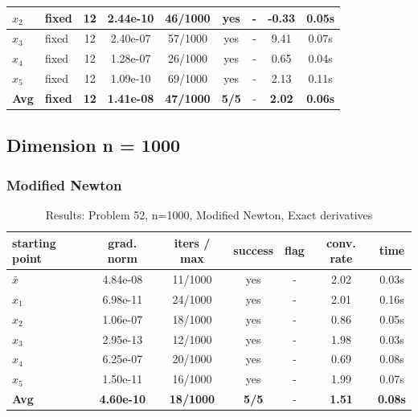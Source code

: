 \begin{longtable}{|l|l|c|c|c|c|c|c|c|}
\hline
$x_2$ & fixed & 12 & 2.44e-10 & 46/1000 & yes & - & -0.33 & 0.05s \\
\hline
$x_3$ & fixed & 12 & 2.40e-07 & 57/1000 & yes & - & 9.41 & 0.07s \\
\hline
$x_4$ & fixed & 12 & 1.28e-07 & 26/1000 & yes & - & 0.65 & 0.04s \\
\hline
$x_5$ & fixed & 12 & 1.09e-10 & 69/1000 & yes & - & 2.13 & 0.11s \\
\hline
\hline\hline
\textbf{Avg} & \textbf{fixed} & \textbf{12} & \textbf{1.41e-08} & \textbf{47/1000} & \textbf{5/5} & - & \textbf{2.02} & \textbf{0.06s} \\
\hline\hline
\end{longtable}


\subsection{Dimension n = 1000}

\subsubsection{Modified Newton}

\begin{longtable}{|l|c|c|c|c|c|c|}
\caption{Results: Problem 52, n=1000, Modified Newton, Exact derivatives} \\
\hline
\textbf{starting point} & \textbf{grad. norm} & \textbf{iters / max} & \textbf{success} & \textbf{flag} & \textbf{conv. rate} & \textbf{time} \\
\hline
\endfirsthead
\endhead
\endfoot
\hline
\endlastfoot
$\bar{x}$ & 4.84e-08 & 11/1000 & yes & - & 2.02 & 0.03s \\
\hline
$x_1$ & 6.98e-11 & 24/1000 & yes & - & 2.01 & 0.16s \\
\hline
$x_2$ & 1.06e-07 & 18/1000 & yes & - & 0.86 & 0.05s \\
\hline
$x_3$ & 2.95e-13 & 12/1000 & yes & - & 1.98 & 0.03s \\
\hline
$x_4$ & 6.25e-07 & 20/1000 & yes & - & 0.69 & 0.08s \\
\hline
$x_5$ & 1.50e-11 & 16/1000 & yes & - & 1.99 & 0.07s \\
\hline
\hline\hline
\textbf{Avg} & \textbf{4.60e-10} & \textbf{18/1000} & \textbf{5/5} & - & \textbf{1.51} & \textbf{0.08s} \\
\hline\hline
\end{longtable}


